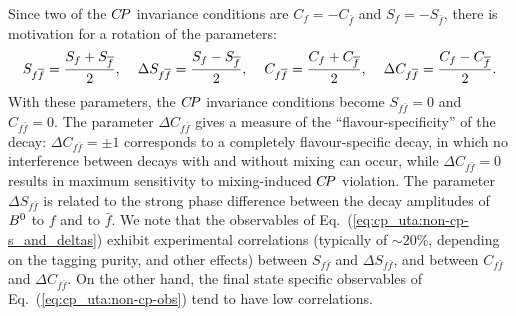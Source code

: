 Since two of the $C\!P$ invariance conditions are 
$C_f = - C_{\bar{f}}$ and $S_f = - S_{\bar{f}}$,
there is motivation for a rotation of the parameters:
\begin{equation}
\label{eq:cp_uta:non-cp-s_and_deltas}
  S_{f\bar{f}} = \frac{S_{f} + S_{\bar{f}}}{2},
  \hspace{4mm}
  \Delta S_{f\bar{f}} = \frac{S_{f} - S_{\bar{f}}}{2},
  \hspace{4mm}
  C_{f\bar{f}} = \frac{C_{f} + C_{\bar{f}}}{2},
  \hspace{4mm}
  \Delta C_{f\bar{f}} = \frac{C_{f} - C_{\bar{f}}}{2}.
\end{equation}
With these parameters, the $C\!P$ invariance conditions become
$S_{f\bar{f}} = 0$ and $C_{f\bar{f}} = 0$. 
The parameter $\Delta C_{f\bar{f}}$ gives a measure of the ``flavour-specificity''
of the decay:
$\Delta C_{f\bar{f}}=\pm1$ corresponds to a completely flavour-specific decay,
in which no interference between decays with and without mixing can occur,
while $\Delta C_{f\bar{f}} = 0$ results in 
maximum sensitivity to mixing-induced $C\!P$ violation.
The parameter $\Delta S_{f\bar{f}}$ is related to the strong phase difference 
between the decay amplitudes of $B^0$ to $f$ and to $\bar f$. 
We note that the observables of Eq.~(\ref{eq:cp_uta:non-cp-s_and_deltas})
exhibit experimental correlations 
(typically of $\sim 20\%$, depending on the tagging purity, and other effects)
between $S_{f\bar{f}}$ and  $\Delta S_{f\bar{f}}$, 
and between $C_{f\bar{f}}$ and $\Delta C_{f\bar{f}}$. 
On the other hand, 
the final state specific observables of Eq.~(\ref{eq:cp_uta:non-cp-obs})
tend to have low correlations.

